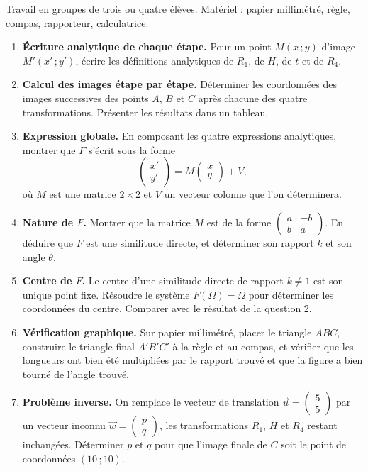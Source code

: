 \documentclass[11pt]{article}
\newcounter{popsec}
\newcounter{popsub}
\newcommand{\courssub}[1]{%
  \stepcounter{popsub}%
  \par\vspace{9pt}\noindent{\popxbold\fontsize{11.5}{13}\selectfont\color{popink}{\color{poporange}\thepopsec.\thepopsub}\hspace{6pt}#1}\par\nopagebreak\vspace{4pt}
}
\begin{document}
\courssub{Consignes}

Travail en groupes de trois ou quatre élèves. Matériel : papier millimétré, règle, compas, rapporteur, calculatrice.

\begin{enumerate}
\item \textbf{Écriture analytique de chaque étape.} Pour un point $M(x\,;y)$ d'image $M'(x'\,;y')$, écrire les définitions analytiques de $R_1$, de $H$, de $t$ et de $R_4$.
\item \textbf{Calcul des images étape par étape.} Déterminer les coordonnées des images successives des points $A$, $B$ et $C$ après chacune des quatre transformations. Présenter les résultats dans un tableau.
\item \textbf{Expression globale.} En composant les quatre expressions analytiques, montrer que $F$ s'écrit sous la forme
\[ \begin{pmatrix} x' \\ y' \end{pmatrix} = M\begin{pmatrix} x \\ y \end{pmatrix} + V, \]
où $M$ est une matrice $2\times 2$ et $V$ un vecteur colonne que l'on déterminera.
\item \textbf{Nature de $F$.} Montrer que la matrice $M$ est de la forme $\begin{pmatrix} a & -b \\ b & a \end{pmatrix}$. En déduire que $F$ est une similitude directe, et déterminer son rapport $k$ et son angle $\theta$.
\item \textbf{Centre de $F$.} Le centre d'une similitude directe de rapport $k \neq 1$ est son unique point fixe. Résoudre le système $F(\Omega) = \Omega$ pour déterminer les coordonnées du centre. Comparer avec le résultat de la question 2.
\item \textbf{Vérification graphique.} Sur papier millimétré, placer le triangle $ABC$, construire le triangle final $A'B'C'$ à la règle et au compas, et vérifier que les longueurs ont bien été multipliées par le rapport trouvé et que la figure a bien tourné de l'angle trouvé.
\item \textbf{Problème inverse.} On remplace le vecteur de translation $\vec{u} = \begin{pmatrix} 5 \\ 5 \end{pmatrix}$ par un vecteur inconnu $\vec{w} = \begin{pmatrix} p \\ q \end{pmatrix}$, les transformations $R_1$, $H$ et $R_4$ restant inchangées. Déterminer $p$ et $q$ pour que l'image finale de $C$ soit le point de coordonnées $(10\,;10)$.
\end{enumerate}
\end{document}
